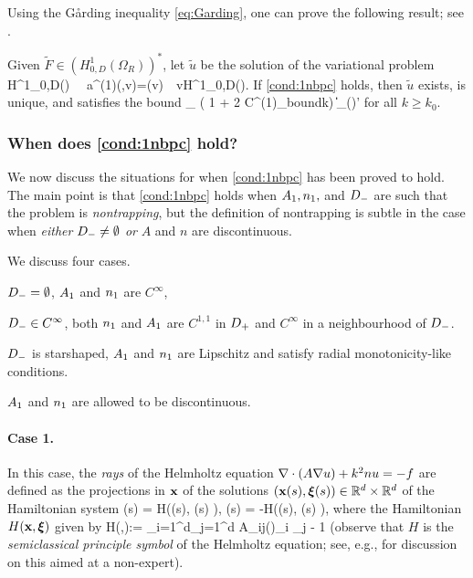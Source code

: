 Using the G\aa rding inequality \cref{eq:Garding}, one can prove the following result; see \cite[Lemma 5.1]{GrPeSp:19}.

\label{lem:H1}
Given $\widetilde{F}\in (H^1_{0,D}(\Omega_R))^*$, let $\widetilde{u}$ be the solution of the variational problem
\beqs
{} \,\, \in H^1_{0,D}(\DR) \,\,\tst \,\,
a^{(1)}(,v)=(v) \,\, \tfa v\in H^1_{0,D}(\DR).
\eeqs
If \cref{cond:1nbpc} holds, then $\widetilde{u}$ exists, is unique, and satisfies the bound
\beq\label{eq:bound2}
_{\HokDR} \leq {}\left( 1 + 2 C^{(1)}_{\rm bound}\nomax  k\right) \big\|\big\|_{(\HokDR)'}
\eeq
for all $k\geq k_0$.
\ele


\subsubsection{When does \cref{cond:1nbpc} hold?}\label{sec:cond1hold}

We now discuss the situations for when \cref{cond:1nbpc} has been proved to hold. The main point is that \cref{cond:1nbpc} holds when $A_{1}, n_{1},$ and $D_{-}$ are such that the problem is \emph{nontrapping}, but the definition of nontrapping is subtle in the case when \emph{either} $D_{-} \neq\emptyset$ \emph{or} $A$ and $n$ are discontinuous.

We discuss four cases.
\ben
\item[Case 1:] $D_{-}=\emptyset$, $A_{1}$ and $n_{1}$ are $C^\infty$,
\item[Case 2:] $D_{-}\in C^\infty$, both $n_{1}$ and $A_{1}$ are $C^{1,1}$ in $D_{+}$ and $C^\infty$ in a neighbourhood of $D_{-}$.
\item[Case 3:] $D_{-}$ is starshaped, $A_{1}$ and $n_{1}$ are Lipschitz and satisfy radial monotonicity-like conditions.
\item[Case 4:] $A_{1}$ and $n_{1}$ are allowed to be discontinuous.
\een

\paragraph{Case 1.}
In this case, %
the \emph{rays} of the Helmholtz equation $\nabla\cdot(A\nabla u)+ k^2 nu =-f$ are defined as the projections in $\mathbf{x}$ of the solutions $(\mathbf{x}(s), \boldsymbol{\xi}(s)) \in \mathbb R^{d}\times \mathbb R^{d}$ of the Hamiltonian system
\beq\label{eq:rays}
(s) = H\big(\bx(s), \bxi(s) \big), \qquad
(s)
 = -H\big(\bx(s), \bxi(s) \big),
\eeq
where the Hamiltonian $H(\mathbf{x},\boldsymbol{\xi})$ given by 
\beqs
H(\bx,\bxi):= \sum_{i=1}^d\sum_{j=1}^{d} A_{ij}(\bx)\xi_i \xi_j - 1%
\eeqs
(observe that $H$ is the \emph{semiclassical principle symbol} of the Helmholtz equation; see, e.g., \cite[\S7]{GrPeSp:19} for discussion on this aimed at a non-expert).

